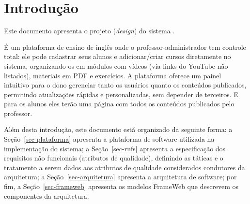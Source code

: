 \chapter{Introdução}
\label{sec-intro}
\vspace{-1cm}

Este documento apresenta o projeto (\textit{design}) do sistema \emph{\imprimirtitulo}. 

É um plataforma de ensino de inglês onde o professor-administrador tem controle total: ele pode cadastrar seus alunos e adicionar/criar cursos diretamente no sistema, organizando-os em módulos com vídeos (via links do YouTube não listados), materiais em PDF e exercícios. A plataforma oferece um painel intuitivo para o dono gerenciar tanto os usuários quanto os conteúdos publicados, permitindo atualizações rápidas e personalizadas, sem depender de terceiros. E para os alunos eles terão uma página com todos os conteúdos publicados pelo professor.


Além desta introdução, este documento está organizado da seguinte forma: 
a Seção~\ref{sec-plataforma} apresenta a plataforma de software utilizada na implementação do sistema;
a Seção~\ref{sec-rnfs} apresenta a especificação dos requisitos não funcionais (atributos de qualidade), definindo as táticas e o tratamento a serem dados aos atributos de qualidade considerados condutores da arquitetura; 
a Seção~\ref{sec-arquitetura} apresenta a arquitetura de software; por fim, 
a Seção~\ref{sec-frameweb} apresenta os modelos FrameWeb que descrevem os componentes da arquitetura.

